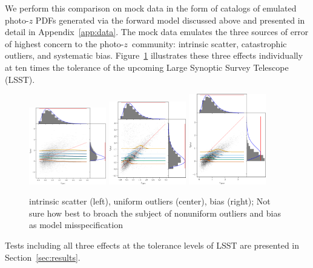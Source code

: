 \documentclass[iop]{emulateapj}
\newcommand{\pz}{photo-$z$}
\newcommand{\pzpdf}{photo-$z$ PDF}
\begin{document}
We perform this comparison on mock data in the form of catalogs of emulated 
\pzpdf s generated via the forward model discussed above and presented in 
detail in Appendix~\ref{app:data}.
The mock data emulates the three sources of error of highest concern to the 
\pz\ community: intrinsic scatter, catastrophic outliers, and systematic bias.
Figure~\ref{fig:mega_scatter} illustrates these three effects individually at 
ten times the tolerance of the upcoming Large Synoptic Survey Telescope (LSST).
\begin{figure}
	\begin{center}
		
\includegraphics[width=0.3\textwidth]{fig/hivarsigmas_scatter.png}
    \includegraphics[width=0.3\textwidth]{fig/uouthi_scatter.png}
    \includegraphics[width=0.3\textwidth]{fig/neghivarbias_scatter.png}
		\caption{intrinsic scatter (left), uniform outliers (center), 
bias (right);
    Not sure how best to broach the subject of nonuniform outliers and bias as 
model misspecification
    }
		\label{fig:mega_scatter}
	\end{center}
\end{figure}
Tests including all three effects at the tolerance levels of LSST are presented 
in Section~\ref{sec:results}.
\end{document}
